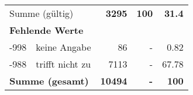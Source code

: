 \begin{longtable}{lXrrr}
     \midrule
     \multicolumn{2}{l}{Summe (gültig)} &
       \textbf{\num{3295}} &
     \textbf{100} &
       \textbf{\num[round-mode=places,round-precision=2]{31,4}} \\
     \multicolumn{5}{l}{\textbf{Fehlende Werte}}\\
       -998 &
       keine Angabe &
         \num{86} &
        - &
         \num[round-mode=places,round-precision=2]{0,82} \\
       -988 &
       trifft nicht zu &
         \num{7113} &
        - &
         \num[round-mode=places,round-precision=2]{67,78} \\
     \midrule
     \multicolumn{2}{l}{\textbf{Summe (gesamt)}} &
          \textbf{\num{10494}} &
        \textbf{-} &
        \textbf{100} \\
     \bottomrule
     \end{longtable}
     
